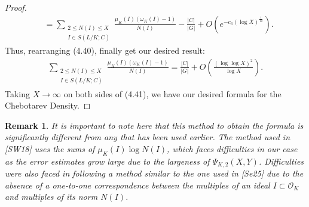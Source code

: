 \documentclass[12pt]{article}
\numberwithin{equation}{section}
\newtheorem{remark}[theorem]{Remark}
\numberwithin{equation}{section}
\begin{document}
\begin{proof}
\begin{align}
    &=\sum_{\substack{2\leq N(I) \leq X \\ I \in S(L/K;C)}}\frac{\mu_K(I)(\omega_K(I)-1)}{N(I)} - \frac{|C|}{|G|} + O\left(e^{-c_6(\log X)^{\frac{1}{12}}}\right).
\end{align}
Thus, rearranging (4.40), finally get our desired result:
\begin{align}
    \sum_{\substack{2\leq N(I) \leq X \\ I \in S(L/K;C)}}\frac{\mu_K(I)(\omega_K(I)-1)}{N(I)} = \frac{|C|}{|G|}+ O\left(\frac{(\log\log X)^2}{\log X}\right) .
\end{align}
Taking $X\to \infty$ on both sides of (4.41), we have our desired formula for the Chebotarev Density.
\end{proof}
\begin{remark}
    It is important to note here that this method to obtain the formula is significantly different from any that has been used earlier. The method used in [SW18] uses the sums of $\mu_K(I)\log N(I)$, which faces difficulties in our case as the error estimates grow large due to the largeness of $\Psi_{K,2}(X,Y)$. Difficulties were also faced in following a method similar to the one used in [Se25] due to the absence of a one-to-one correspondence between the multiples of an ideal $I \subset \mathcal{O}_K$ and multiples of its norm  $N(I)$. 
\end{remark}
\end{document}
